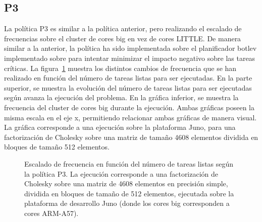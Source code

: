 \subsection{P3}
La política P3 es similar a la política anterior, pero realizando el
escalado de frecuencias sobre el cluster de cores big en vez de cores
LITTLE. De manera similar a la anterior, la política ha sido implementada
sobre el planificador botlev implementado sobre \ompss para intentar
minimizar el impacto negativo sobre las tareas críticas. La
figura~\ref{s5:fig:P3-evo} muestra los distintos cambios de frecuencia que
se han realizado en función del número de tareas listas para ser
ejecutadas. En la parte superior, se muestra la evolución del número de
tareas listas para ser ejecutadas según avanza la ejecución del
problema. En la gráfica inferior, se muestra la frecuencia del cluster de
cores big durante la ejecución. Ambas gráficas poseen la misma escala en el
eje x, permitiendo relacionar ambas gráficas de manera visual. La gráfica
corresponde a una ejecución sobre la plataforma Juno, para una
factorización de Cholesky sobre una matriz de tamaño 4608 elementos
dividida en bloques de tamaño 512 elementos.\\


\begin{figure}
  \centering
  \setlength{\fboxsep}{5pt}
  \caption[Escalado de frecuencia en función del número de tareas listas
  según la política P3]{Escalado de frecuencia en función del número de
    tareas listas según la política P3. La ejecución corresponde a una
    factorización de Cholesky sobre una matriz de 4608 elementos en
    precisión simple, dividida en bloques de tamaño de 512 elementos,
    ejecutada sobre la plataforma de desarrollo Juno (donde los cores big
    corresponden a cores ARM-A57).}
  \label{s5:fig:P3-evo}
\end{figure}



